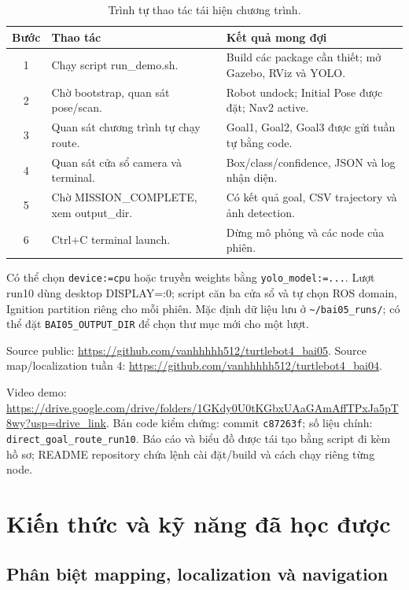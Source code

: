 \documentclass[a4paper,11pt]{article}
\newcommand{\code}[1]{\nolinkurl{#1}}
\begin{document}
\begin{table}[H]\centering\small
\begin{tabular}{@{}cp{7.0cm}p{8.1cm}@{}}\toprule
Bước & Thao tác & Kết quả mong đợi\\\midrule
1 & Chạy script run\_demo.sh. & Build các package cần thiết; mở Gazebo, RViz và YOLO.\\
2 & Chờ bootstrap, quan sát pose/scan. & Robot undock; Initial Pose được đặt; Nav2 active.\\
3 & Quan sát chương trình tự chạy route. & Goal1, Goal2, Goal3 được gửi tuần tự bằng code.\\
4 & Quan sát cửa sổ camera và terminal. & Box/class/confidence, JSON và log nhận diện.\\
5 & Chờ MISSION\_COMPLETE, xem output\_dir. & Có kết quả goal, CSV trajectory và ảnh detection.\\
6 & Ctrl+C terminal launch. & Dừng mô phỏng và các node của phiên.\\\bottomrule
\end{tabular}
\caption{Trình tự thao tác tái hiện chương trình.}
\end{table}

Có thể chọn \code{device:=cpu} hoặc truyền weights bằng \code{yolo_model:=...}.
Lượt run10 dùng desktop DISPLAY=:0; script căn ba cửa sổ và tự chọn ROS domain,
Ignition partition riêng cho mỗi phiên. Mặc định dữ liệu lưu ở \code{~/bai05_runs/};
có thể đặt \code{BAI05_OUTPUT_DIR} để chọn thư mục mới cho một lượt.

Source public: \url{https://github.com/vanhhhhh512/turtlebot4_bai05}.
Source map/localization tuần 4: \url{https://github.com/vanhhhhh512/turtlebot4_bai04}.

Video demo: \url{https://drive.google.com/drive/folders/1GKdy0U0tKGbxUAaGAmAffTPxJa5pT8wy?usp=drive_link}.
Bản code kiểm chứng: commit \code{c87263f}; số liệu chính: \code{direct_goal_route_run10}.
Báo cáo và biểu đồ được tái tạo bằng script đi kèm hồ sơ; README repository
chứa lệnh cài đặt/build và cách chạy riêng từng node.

\section{Kiến thức và kỹ năng đã học được}
\subsection{Phân biệt mapping, localization và navigation}
\end{document}
